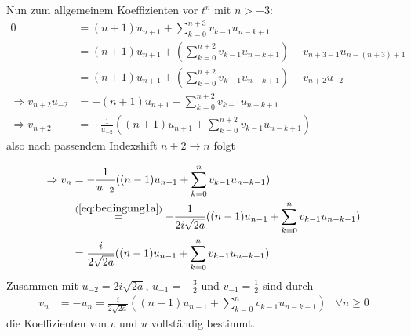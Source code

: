 Nun zum allgemeinem Koeffizienten vor $t^{n}$ mit $n>-3$:
\begin{align*}
0&= (n+1)u_{n+1} + \sum_{k=0}^{n+3} v_{k-1}u_{n-k+1}
\\&= (n+1)u_{n+1} + (\sum_{k=0}^{n+2} v_{k-1}u_{n-k+1})
  + v_{n+3-1}u_{n-(n+3)+1}
\\&= (n+1)u_{n+1} + (\sum_{k=0}^{n+2} v_{k-1}u_{n-k+1}) + v_{n+2}u_{-2}
\\\Rightarrow v_{n+2}u_{-2}&=-(n+1)u_{n+1} - \sum_{k=0}^{n+2} v_{k-1}u_{n-k+1}
\\\Rightarrow v_{n+2} &= - \frac{1}{u_{-2}}
  ((n+1)u_{n+1} + \sum_{k=0}^{n+2} v_{k-1}u_{n-k+1})
\end{align*}
also nach passendem Indexshift $n+2\rightarrow n$ folgt
\begin{comment} TODO: mapsto pfeil?  \end{comment}
\begin{align*}
\Rightarrow v_{n} &= - \frac{1}{u_{-2}}
  ((n-1)u_{n-1} + \sum_{k=0}^{n} v_{k-1}u_{n-k-1})
\\&\overset{(\ref{eq:bedingung1a})}{=} - \frac{1}{2i\sqrt{2a}}
  ((n-1)u_{n-1} + \sum_{k=0}^{n} v_{k-1}u_{n-k-1})
\\&= \frac{i}{2\sqrt{2a}}
  ((n-1)u_{n-1} + \sum_{k=0}^{n} v_{k-1}u_{n-k-1})
\end{align*}
Zusammen mit $u_{-2}=2i\sqrt{2a}$, $u_{-1}=-\frac{3}{2}$ und
$v_{-1}=\frac{1}{2}$ sind durch
\begin{align}
v_n &= - u_n = \frac{i}{2\sqrt{2a}}
  ((n-1)u_{n-1} + \sum_{k=0}^{n} v_{k-1}u_{n-k-1}) & \forall n \geq 0
\end{align}
die Koeffizienten von $v$ und $u$ vollständig bestimmt.

